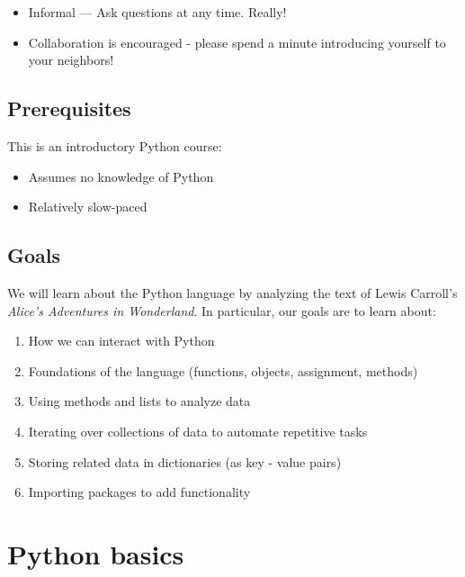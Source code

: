 \documentclass[]{book}
\providecommand{\tightlist}{%
  \setlength{\itemsep}{0pt}\setlength{\parskip}{0pt}}
\begin{document}
\begin{itemize}
\tightlist
\item
  Informal --- Ask questions at any time. Really!
\item
  Collaboration is encouraged - please spend a minute introducing yourself to your neighbors!
\end{itemize}

\hypertarget{prerequisites-4}{%
\subsection{Prerequisites}\label{prerequisites-4}}

This is an introductory Python course:

\begin{itemize}
\tightlist
\item
  Assumes no knowledge of Python
\item
  Relatively slow-paced
\end{itemize}

\hypertarget{goals-1}{%
\subsection{Goals}\label{goals-1}}

We will learn about the Python language by analyzing the text of Lewis Carroll's \emph{Alice's Adventures in Wonderland}.
In particular, our goals are to learn about:

\begin{enumerate}
\def\labelenumi{\arabic{enumi}.}
\tightlist
\item
  How we can interact with Python
\item
  Foundations of the language (functions, objects, assignment, methods)
\item
  Using methods and lists to analyze data
\item
  Iterating over collections of data to automate repetitive tasks
\item
  Storing related data in dictionaries (as key - value pairs)
\item
  Importing packages to add functionality
\end{enumerate}

\hypertarget{python-basics}{%
\section{Python basics}\label{python-basics}}
\end{document}
